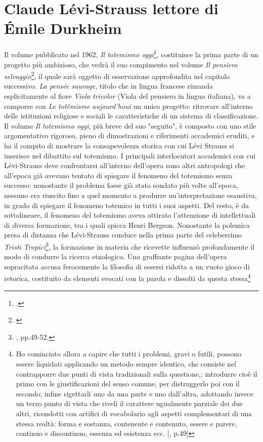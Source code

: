 \section{Claude Lévi-Strauss lettore di Émile Durkheim}
Il volume pubblicato nel 1962, \textit{Il totemismo oggi}\footnote{\cite{levi2020totemismo}.}, costituisce la prima parte di un progetto più ambizioso, che vedrà il suo compimento nel volume \textit{Il pensiero selvaggio}\footnote{\cite{levi2010pensiero}}, il quale sarà oggetto di osservazione approfondita nel capitolo successivo.
\textit{La pensée sauvage}, titolo che in lingua francese rimanda esplicitamente al fiore \textit{Viola tricolor} (Viola del pensiero in lingua italiana), va a comporre con \textit{Le totémisme aujourd'houi} un unico progetto: ritrovare all'interno delle istituzioni religiose e sociali le caratteristiche di un sistema di classificazione.
Il volume \textit{Il totemismo oggi}, più breve del suo "seguito", è composto con uno stile argomentativo rigoroso, pieno di dimostrazioni e riferimenti accademici eruditi, e ha il compito di mostrare la consapevolezza storica con cui Lévi Strauss si inserisce nel dibattito sul totemismo.
I principali interlocutori accademici con cui Lévi-Strauss deve confrontarsi all'interno dell'opera sono altri antropologi che all'epoca già avevano tentato di spiegare il fenomeno del totemismo senza successo: nonostante il problema fosse già stato sondato più volte all'epoca, nessuno era riuscito fino a quel momento a produrre un'interpretazione esaustiva, in grado di spiegare il fenomeno totemico in tutti i suoi aspetti. Del resto, è da sottolineare, il fenomeno del totemismo aveva attirato l'attenzione di intellettuali di diversa formazione, tra i quali spicca Henri Bergson.
Nonostante la polemica presa di distanza che Lévi-Strauss conduce nella prima parte del celeberrimo \textit{Tristi Tropici}\footnote{\cite{levi1960tristi}, pp.49-52.}, la formazione in materia che ricevette influenzò profondamente il modo di condurre la ricerca etnologica. Una graffiante pagina dell'opera sopracitata accusa ferocemente la filosofia di essersi ridotta a un vuoto gioco di retorica, costituito da elementi evocati con la parola e dissolti da questa stessa\footnote{Ho cominciato allora a capire che tutti i problemi, gravi o futili, possono essere liquidati applicando un metodo sempre identico, che consiste nel contrapporre due punti di vista tradizionali sulla questione,; introdurre cioè il primo con le giustificazioni del senso comune, per distruggerlo poi con il secondo; infine rigettarli uno da una parte e uno dall'altra, adottando invece un terzo punto di vista che riveli il carattere ugualmente parziale dei due altri, ricondotti con artifici di vocabolario agli aspetti complementari di una stessa realtà: forma e sostanza, contenente e contenuto, essere e parere, continuo e discontinuo, essenza ed esistenza ecc. [\cite{levi1960tristi}, p.49]}